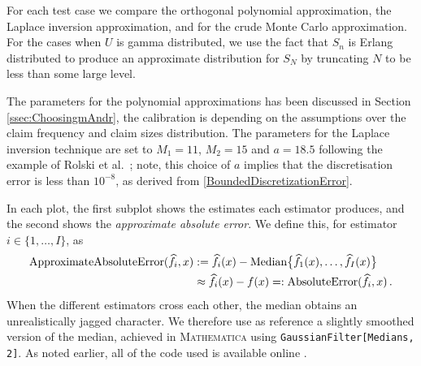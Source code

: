 For each test case we compare the orthogonal polynomial approximation, the Laplace inversion approximation, and for the crude Monte Carlo approximation. For the cases when $U$ is gamma distributed, we use the fact that $S_n$ is Erlang distributed to produce an approximate distribution for $S_N$ by truncating $N$ to be less than some large level.


The parameters for the polynomial approximations has been discussed in Section \ref{ssec:ChoosingmAndr}, the calibration is depending on the assumptions over the claim frequency and claim sizes distribution.
The parameters for the Laplace inversion technique are set to $M_1=11$, $M_2=15$ and $a=18.5$ following the example of Rolski et al.\ \cite[Chapter 5, Section 5]{RoScScTe08}; note, this choice of $a$ implies that the discretisation error is less than $10^{-8}$, as derived from \eqref{BoundedDiscretizationError}.


In each plot, the first subplot shows the estimates each estimator produces, and the second shows the \emph{approximate absolute error}. We define this, for estimator $i \in \{1,\dots,I\}$, as
\begin{align*}
\text{ApproximateAbsoluteError}( \widehat{f}_i, x )
&:= \widehat{f}_i(x)- \text{Median}\big\{ \widehat{f}_1(x),\dots,\widehat{f}_I(x) \big\} \\
&\approx \widehat{f}_i(x)-f(x) =: \text{AbsoluteError}( \widehat{f}_i, x ) \,.
\end{align*}
When the different estimators cross each other, the median obtains an unrealistically jagged character. We therefore use as reference a slightly smoothed version of the median, achieved in \textsc{Mathematica} using \texttt{GaussianFilter[Medians, 2]}. As noted earlier, all of the code used is available online \cite{StoplossCode}.

